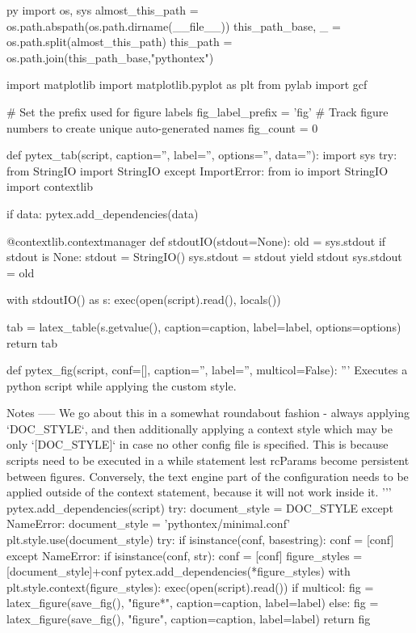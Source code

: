 \begin{pythontexcustomcode}[begin]{py}
import os, sys
almost_this_path = os.path.abspath(os.path.dirname(__file__))
this_path_base, _ = os.path.split(almost_this_path)
this_path = os.path.join(this_path_base,"pythontex")

import matplotlib
import matplotlib.pyplot as plt
from pylab import gcf

# Set the prefix used for figure labels
fig_label_prefix = 'fig'
# Track figure numbers to create unique auto-generated names
fig_count = 0

def pytex_tab(script, caption='', label='', options='', data=''):
    import sys
    try:
        from StringIO import StringIO
    except ImportError:
        from io import StringIO
    import contextlib

    if data:
        pytex.add_dependencies(data)

    @contextlib.contextmanager
    def stdoutIO(stdout=None):
        old = sys.stdout
        if stdout is None:
            stdout = StringIO()
        sys.stdout = stdout
        yield stdout
        sys.stdout = old

    with stdoutIO() as s:
        exec(open(script).read(), locals())

    tab = latex_table(s.getvalue(), caption=caption, label=label, options=options)
    return tab

def pytex_fig(script, conf=[], caption='', label='', multicol=False):
    '''
    Executes a python script while applying the custom style.

    Notes
    -----
    We go about this in a somewhat roundabout fashion - always applying `DOC_STYLE`, and then additionally applying a context style which may be only `[DOC_STYLE]` in case no other config file is specified.
    This is because scripts need to be executed in a while statement lest rcParams become persistent between figures.
    Conversely, the text engine part of the configuration needs to be applied outside of the context statement, because it will not work inside it.
    '''
    pytex.add_dependencies(script)
    try:
        document_style = DOC_STYLE
    except NameError:
        document_style = 'pythontex/minimal.conf'
    plt.style.use(document_style)
    try:
        if isinstance(conf, basestring):
            conf = [conf]
    except NameError:
        if isinstance(conf, str):
            conf = [conf]
    figure_styles = [document_style]+conf
    pytex.add_dependencies(*figure_styles)
    with plt.style.context(figure_styles):
        exec(open(script).read())
    if multicol:
        fig = latex_figure(save_fig(), "figure*", caption=caption, label=label)
    else:
        fig = latex_figure(save_fig(), "figure", caption=caption, label=label)
    return fig


\end{pythontexcustomcode}
